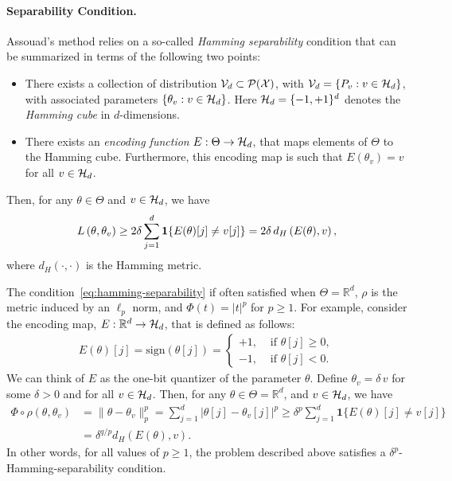 \documentclass[12pt]{article}
\begin{document}
\paragraph{Separability Condition.} Assouad's method relies on a so-called \emph{Hamming separability} condition that can be summarized in terms of the following two points: 
\begin{itemize}
	\item There exists a collection of distribution ${\cal V}_d \subset {\cal P}({\cal X})$, with ${\cal V}_d = \{P_v: v \in {\cal H}_d\}$, with associated parameters $\{\theta_v: v \in {\cal H}_d\}$. Here ${\cal H}_d = \{-1, +1\}^d$ denotes the \emph{Hamming cube} in $d$-dimensions. 

	\item There exists an \emph{encoding function} $E: \Theta \to {\cal H}_d$, that maps elements of $\Theta$ to the Hamming cube. Furthermore, this encoding map is such that $E(\theta_v) = v$ for all $v \in {\cal H}_d$. 
\end{itemize}
Then, for any $\theta \in \Theta$ and $v \in {\cal H}_d$, we have 
	\begin{align}
		L\left( \theta, \theta_v \right) \geq 2 \delta \sum_{j=1}^d \boldsymbol{1} \{E(\theta)[j] \neq v[j]\} = 2 \delta \,d_{H}\left( E(\theta),  v \right),  \label{eq:hamming-separability}
	\end{align}
	where $d_H(\cdot, \cdot)$ is the Hamming metric.
\begin{example}
	\label{example:separability-condition-assouad} The condition~\eqref{eq:hamming-separability} if often satisfied when $\Theta = \mathbb{R}^d$, $\rho$ is the metric induced by an $\ell_p$ norm, and $\Phi(t) = |t|^p$  for $p \geq 1$. For example, consider the encoding map, $E: \mathbb{R}^d \to {\cal H}_d$, that is defined as follows:  
	\begin{align}
		E(\theta)[j] = \mathrm{sign}(\theta[j]) = \begin{cases}
			+1, & \text{ if } \theta[j] \geq 0, \\
			-1, & \text{ if } \theta[j] < 0.
		\end{cases}
	\end{align}
	We can think of $E$ as the one-bit quantizer of the parameter $\theta$. 
	Define $\theta_v = \delta \, v$ for some $\delta>0$ and for all $v \in {\cal H}_d$. Then, for any $\theta \in \Theta = \mathbb{R}^d$, and $v \in {\cal H}_d$, we have  
	\begin{align}
		\Phi \circ \rho(\theta, \theta_v) &= \|\theta - \theta_v\|_p^p = \sum_{j=1}^d|\theta[j]-\theta_v[j]|^{p} \geq \delta^{p} \sum_{j=1}^d \boldsymbol{1}\{ E(\theta)[j]\neq v[j]\} \\
		& = \delta^{q/p} d_H(E(\theta), v). 
	\end{align}
	In other words, for all values of $p \geq 1$, the problem described above satisfies a $\delta^{p}$-Hamming-separability condition. 
\end{example}
\end{document}
